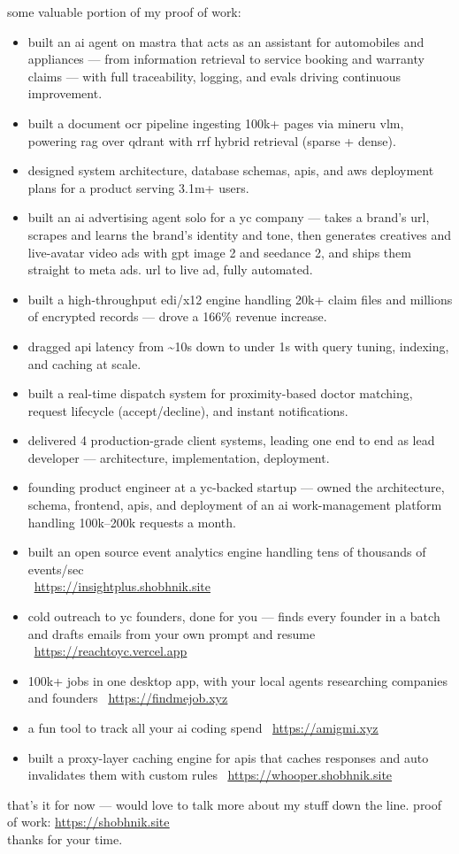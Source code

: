 \documentclass[11pt,a4paper]{article}
\newcommand{\proof}[1]{\underline{\href{#1}{#1}}}
\begin{document}
some valuable portion of my proof of work:
\begin{itemize}
\item built an ai agent on mastra that acts as an assistant for automobiles and appliances --- from information retrieval to service booking and warranty claims --- with full traceability, logging, and evals driving continuous improvement.
\item built a document ocr pipeline ingesting 100k+ pages via mineru vlm, powering rag over qdrant with rrf hybrid retrieval (sparse + dense).
\item designed system architecture, database schemas, apis, and aws deployment plans for a product serving 3.1m+ users.
\item built an ai advertising agent solo for a yc company --- takes a brand's url, scrapes and learns the brand's identity and tone, then generates creatives and live-avatar video ads with gpt image 2 and seedance 2, and ships them straight to meta ads. url to live ad, fully automated.
\item built a high-throughput edi/x12 engine handling 20k+ claim files and millions of encrypted records --- drove a 166\% revenue increase.
\item dragged api latency from \textasciitilde 10s down to under 1s with query tuning, indexing, and caching at scale.
\item built a real-time dispatch system for proximity-based doctor matching, request lifecycle (accept/decline), and instant notifications.
\item delivered 4 production-grade client systems, leading one end to end as lead developer --- architecture, implementation, deployment.
\item founding product engineer at a yc-backed startup --- owned the architecture, schema, frontend, apis, and deployment of an ai work-management platform handling 100k--200k requests a month.
\item built an open source event analytics engine handling tens of thousands of events/sec\\ \textrightarrow\ \proof{https://insightplus.shobhnik.site}
\item cold outreach to yc founders, done for you --- finds every founder in a batch and drafts emails from your own prompt and resume \textrightarrow\ \proof{https://reachtoyc.vercel.app}
\item 100k+ jobs in one desktop app, with your local agents researching companies and founders \textrightarrow\ \proof{https://findmejob.xyz}
\item a fun tool to track all your ai coding spend \textrightarrow\ \proof{https://amigmi.xyz}
\item built a proxy-layer caching engine for apis that caches responses and auto invalidates them with custom rules \textrightarrow\ \proof{https://whooper.shobhnik.site}
\end{itemize}

that's it for now --- would love to talk more about my stuff down the line. proof of work: \proof{https://shobhnik.site}\\
thanks for your time.
\end{document}
